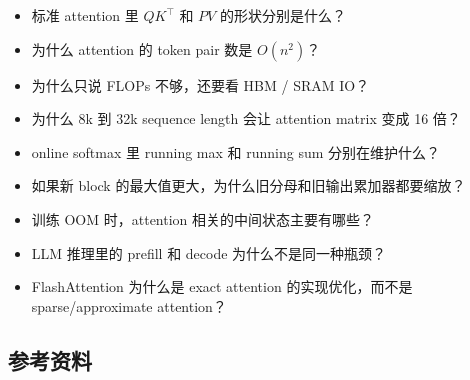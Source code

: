 \begin{itemize}[leftmargin=1.5em]
  \item 标准 attention 里 $QK^\top$ 和 $PV$ 的形状分别是什么？
  \item 为什么 attention 的 token pair 数是 $O(n^2)$？
  \item 为什么只说 FLOPs 不够，还要看 HBM / SRAM IO？
  \item 为什么 8k 到 32k sequence length 会让 attention matrix 变成 16 倍？
  \item online softmax 里 running max 和 running sum 分别在维护什么？
  \item 如果新 block 的最大值更大，为什么旧分母和旧输出累加器都要缩放？
  \item 训练 OOM 时，attention 相关的中间状态主要有哪些？
  \item LLM 推理里的 prefill 和 decode 为什么不是同一种瓶颈？
  \item FlashAttention 为什么是 exact attention 的实现优化，而不是 sparse/approximate attention？
\end{itemize}

\subsection{参考资料}

